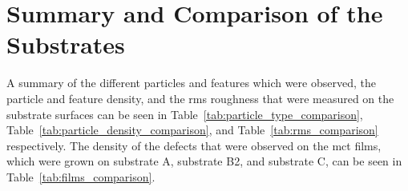 \chapter{Summary and Comparison of the Substrates}\label{app:comparison}

A summary of the different particles and features which were observed, the particle and feature density, and the \ac{rms} roughness that were measured on the substrate surfaces can be seen in Table~\ref{tab:particle_type_comparison}, Table~\ref{tab:particle_density_comparison}, and Table~\ref{tab:rms_comparison} respectively. The density of the defects that were observed on the \ac{mct} films, which were grown on substrate A, substrate B2, and substrate C, can be seen in Table~\ref{tab:films_comparison}.

